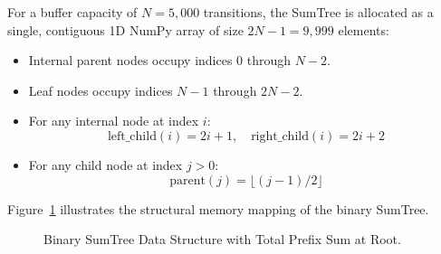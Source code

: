 For a buffer capacity of $N = 5,000$ transitions, the SumTree is allocated as a single, contiguous 1D NumPy array of size $2N - 1 = 9,999$ elements:
\begin{itemize}
    \item Internal parent nodes occupy indices $0$ through $N - 2$.
    \item Leaf nodes occupy indices $N - 1$ through $2N - 2$.
    \item For any internal node at index $i$:
    \begin{equation}
        \text{left\_child}(i) = 2i + 1, \quad \text{right\_child}(i) = 2i + 2
    \end{equation}
    \item For any child node at index $j > 0$:
    \begin{equation}
        \text{parent}(j) = \lfloor (j - 1) / 2 \rfloor
    \end{equation}
\end{itemize}

Figure~\ref{fig:sumtree_diagram} illustrates the structural memory mapping of the binary SumTree.

\begin{figure}[htbp]
\centering
\begin{minipage}{0.85\textwidth}
\centering
{}
\end{minipage}
\caption{Binary SumTree Data Structure with Total Prefix Sum at Root.}
\label{fig:sumtree_diagram}
\end{figure}

